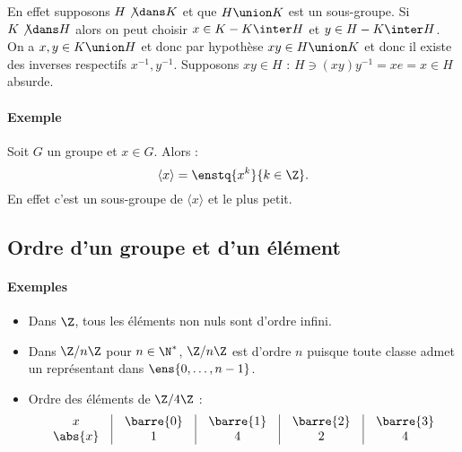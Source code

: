 \documentclass{mybourbaki}
\begin{document}
En effet supposons $H\not\dans K$ et que $H\union K$ est un sous-groupe. Si $K\not\dans H$ alors on peut choisir $x\in K-K\inter H$ et $y\in H-K\inter H$. On a $x,y\in K\union H$ et donc par hypothèse $xy\in H \union K$ et donc il existe des inverses respectifs $x^{-1},y^{-1}$. Supposons $xy\in H$ : $H\ni (xy)y^{-1}=  xe=x\in H$ absurde.



\paragraph{Exemple}Soit $G$ un groupe et $x \in G$. Alors : \[ \langle x \rangle = \enstq{x^{k}}{k\in \Z}.\]
En effet c'est un sous-groupe de $\langle x \rangle$ et le plus petit.

\subsection{Ordre d'un groupe et d'un élément}


\paragraph{Exemples}
\begin{itemize}
\item Dans $\Z$, tous les éléments non nuls sont d'ordre infini.
\item Dans $\Z/n\Z$ pour $n\in \N^{*}$, $\Z/n\Z$ est d'ordre $n$ puisque toute classe admet un représentant dans $\ens{0,\ldots, n-1}$.
\item Ordre des éléments de $\Z/4\Z$ : 
\[ \begin{matrix}
x & \vline & \barre{0} & \vline & \barre{1} & \vline & \barre{2} & \vline & \barre{3} \\
\abs{x} & \vline & 1 & \vline & 4 & \vline & 2 & \vline & 4
\end{matrix}\]
\end{itemize}
\end{document}
